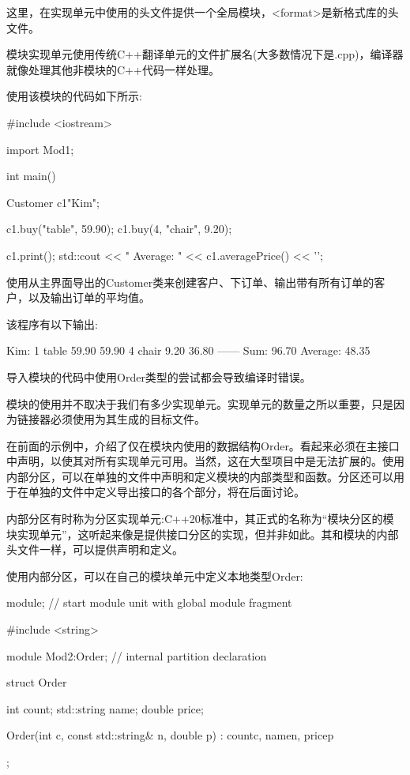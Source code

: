 这里，在实现单元中使用的头文件提供一个全局模块，<format>是新格式库的头文件。

模块实现单元使用传统C++翻译单元的文件扩展名(大多数情况下是.cpp)，编译器就像处理其他非模块的C++代码一样处理。


使用该模块的代码如下所示:


\begin{cpp}
#include <iostream>

import Mod1;

int main()
{
	Customer c1{"Kim"};

	c1.buy("table", 59.90);
	c1.buy(4, "chair", 9.20);

	c1.print();
	std::cout << " Average: " << c1.averagePrice() << '\n';
}
\end{cpp}

使用从主界面导出的Customer类来创建客户、下订单、输出带有所有订单的客户，以及输出订单的平均值。

该程序有以下输出:

\begin{shell}
Kim:
  1 table        59.90   59.90
  4 chair         9.20   36.80
                        ------
    Sum:                 96.70
Average: 48.35
\end{shell}

导入模块的代码中使用Order类型的尝试都会导致编译时错误。

模块的使用并不取决于我们有多少实现单元。实现单元的数量之所以重要，只是因为链接器必须使用为其生成的目标文件。


在前面的示例中，介绍了仅在模块内使用的数据结构Order。看起来必须在主接口中声明，以使其对所有实现单元可用。当然，这在大型项目中是无法扩展的。使用内部分区，可以在单独的文件中声明和定义模块的内部类型和函数。分区还可以用于在单独的文件中定义导出接口的各个部分，将在后面讨论。

内部分区有时称为分区实现单元:C++20标准中，其正式的名称为“模块分区的模块实现单元”，这听起来像是提供接口分区的实现，但并非如此。其和模块的内部头文件一样，可以提供声明和定义。


使用内部分区，可以在自己的模块单元中定义本地类型Order:


\begin{cpp}
module; // start module unit with global module fragment

#include <string>

module Mod2:Order; // internal partition declaration

struct Order {
	int count;
	std::string name;
	double price;

	Order(int c, const std::string& n, double p)
		: count{c}, name{n}, price{p} {
	}
};
\end{cpp}

